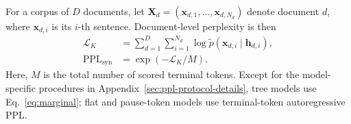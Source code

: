\documentclass[11pt]{article}
\begin{document}
For a corpus of $D$ documents, let $\mathbf{X}_d=(\mathbf{x}_{d,1},\ldots,\mathbf{x}_{d,N_d})$ denote document $d$, where $\mathbf{x}_{d,i}$ is its $i$-th sentence.
Document-level perplexity is then
\begin{align}
\mathcal{L}_K
&= \sum_{d=1}^{D}\sum_{i=1}^{N_d}
\log \widetilde p(\mathbf{x}_{d,i}\mid\mathbf{h}_{d,i}), \nonumber\\
\text{PPL}_{\text{syn}} &= \exp(-\mathcal{L}_K/M).
\label{eq:doc-ppl}
\end{align}
\noindent Here, $M$ is the total number of scored terminal tokens. Except for the model-specific procedures in Appendix~\ref{sec:ppl-protocol-details}, tree models use Eq.~\ref{eq:marginal}; flat and pause-token models use terminal-token autoregressive PPL.


\end{document}
